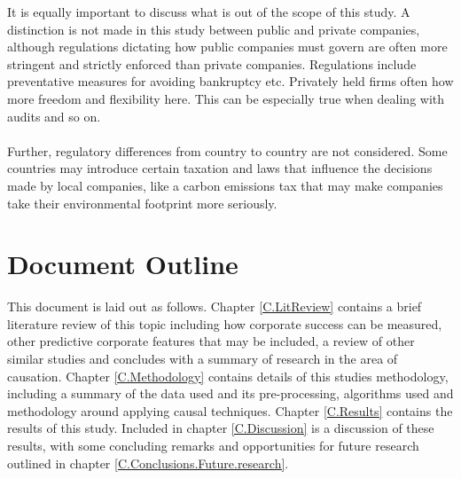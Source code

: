 {\begin{enumerate}
\end{enumerate}
{It is equally important to discuss what is out of the scope of this study. A distinction is not made in this study between public and private companies, although regulations dictating how public companies must govern are often more stringent and strictly enforced than private companies. Regulations include preventative measures for avoiding bankruptcy etc. Privately held firms often how more freedom and flexibility here. This can be especially true when dealing with audits and so on. \\\\
Further, regulatory differences from country to country are not considered. Some countries may introduce certain taxation and laws that influence the decisions made by local companies, like a carbon emissions tax that may make companies take their environmental footprint more seriously.} 
}
\section{Document Outline}
{This document is laid out as follows. Chapter \ref{C.LitReview} contains a brief literature review of this topic including how corporate success can be measured, other predictive corporate features that may be included, a review of other similar studies and concludes with a summary of research in the area of causation. Chapter \ref{C.Methodology} contains details of this studies methodology, including a summary of the data used and its pre-processing, algorithms used and methodology around applying causal techniques. Chapter \ref{C.Results} contains the results of this study. Included in chapter \ref{C.Discussion} is a discussion of these results, with some concluding remarks and opportunities for future research outlined in chapter \ref{C.Conclusions.Future.research}.      }

